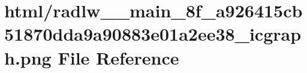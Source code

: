 \hypertarget{radlw____main__8f__a926415cb51870dda9a90883e01a2ee38__icgraph_8png}{}\section{html/radlw\+\_\+\+\_\+main\+\_\+8f\+\_\+a926415cb51870dda9a90883e01a2ee38\+\_\+icgraph.png File Reference}
\label{radlw____main__8f__a926415cb51870dda9a90883e01a2ee38__icgraph_8png}
